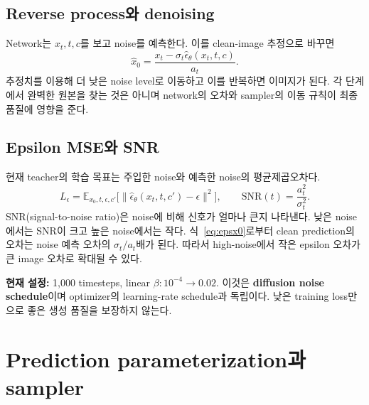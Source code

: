 \documentclass[11pt,a4paper]{article}
\newcommand{\E}{\mathbb{E}}
\begin{document}
\subsection{Reverse process와 denoising}
Network는 $x_t,t,c$를 보고 noise를 예측한다. 이를 clean-image 추정으로 바꾸면
\begin{equation}
\hat x_0=\frac{x_t-\sigma_t\hat\epsilon_\theta(x_t,t,c)}{a_t}.
\label{eq:epsx0}
\end{equation}
추정치를 이용해 더 낮은 noise level로 이동하고 이를 반복하면 이미지가 된다. 각 단계에서 완벽한 원본을 찾는 것은 아니며 network의 오차와 sampler의 이동 규칙이 최종 품질에 영향을 준다.

\subsection{Epsilon MSE와 SNR}
현재 teacher의 학습 목표는 주입한 noise와 예측한 noise의 평균제곱오차다.
\[
L_\epsilon=\E_{x_0,t,\epsilon,c'}\bigl[\|\hat\epsilon_\theta(x_t,t,c')-\epsilon\|^2\bigr],\qquad
\mathrm{SNR}(t)=\frac{a_t^2}{\sigma_t^2}.
\]
SNR(signal-to-noise ratio)은 noise에 비해 신호가 얼마나 큰지 나타낸다. 낮은 noise에서는 SNR이 크고 높은 noise에서는 작다. 식~\eqref{eq:epsx0}로부터 clean prediction의 오차는 noise 예측 오차의 $\sigma_t/a_t$배가 된다. 따라서 high-noise에서 작은 epsilon 오차가 큰 image 오차로 확대될 수 있다.

\textbf{현재 설정:} 1,000 timesteps, linear $\beta:10^{-4}\to0.02$. 이것은 \textbf{diffusion noise schedule}이며 optimizer의 learning-rate schedule과 독립이다. 낮은 training loss만으로 좋은 생성 품질을 보장하지 않는다.

\section{Prediction parameterization과 sampler}
\end{document}

